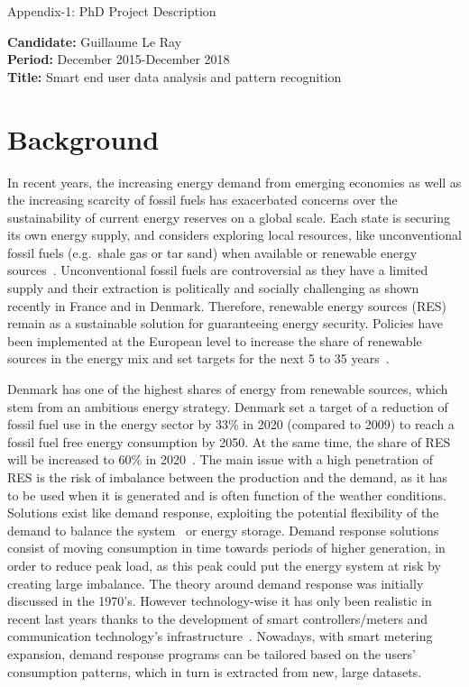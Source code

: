 \documentclass[fleqn,a4paper,twoside,10pt]{article}
\begin{document}
\begin{center}
\LARGE{Appendix-1: PhD Project Description}
\end{center}
\normalsize
\vspace{1cm}
{\bf Candidate:} Guillaume Le Ray\\
{\bf Period:} December 2015-December 2018\\
{\bf Title:} Smart end user data analysis and pattern recognition
\section{Background}
	In recent years, the increasing energy demand from emerging economies as well as the increasing scarcity of fossil fuels has exacerbated concerns over the sustainability of current energy reserves on a global scale. Each state is securing its own energy supply, and considers exploring local resources, like unconventional fossil fuels (e.g.\ shale gas or tar sand) when available or renewable energy sources~\cite{ramchurn2012}. Unconventional fossil fuels are controversial as they have a limited supply and their extraction is politically and socially challenging as shown recently in France and in Denmark. 
	Therefore, renewable energy sources (RES) remain as a sustainable solution for guaranteeing energy security. Policies have been implemented at the European level to increase the share of renewable sources in the energy mix and set targets for the next 5 to 35 years~\cite{2020}.

	Denmark has one of the highest shares of energy from renewable sources, which stem from an ambitious energy strategy. 
	Denmark set a target of a reduction of fossil fuel use in the energy sector by 33\% in 2020 (compared to 2009) to reach a fossil fuel free energy consumption by 2050. 
	At the same time, the share of RES will be increased to 60\% in 2020~\cite{2020DK}. 
	The main issue with a high penetration of RES is the risk of imbalance between the production and the demand, as it has to be used when it is generated and is often function of the weather conditions. 
	Solutions exist like demand response, exploiting the potential flexibility of the demand to balance the system~\cite{Albadi2008} or energy storage. 
	Demand response solutions consist of moving consumption in time towards periods of higher generation, in order to reduce peak load, as this peak could put the energy system at risk by creating large imbalance. The theory around demand response was initially discussed in the 1970's. 
	However technology-wise it has only been realistic in recent last years thanks to the development of smart controllers/meters and communication technology's infrastructure~\cite{Strbac2008}. 
	Nowadays, with smart metering expansion, demand response programs can be tailored based on the users' consumption patterns, which in turn is extracted from new, large datasets.
\end{document}

